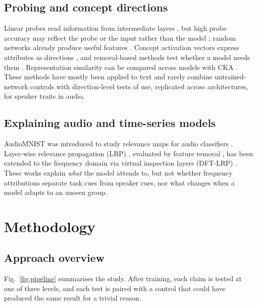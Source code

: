 \documentclass[conference]{IEEEtran}
\begin{document}
\subsection{Probing and concept directions}
Linear probes read information from intermediate layers
\cite{alain2016probes}, but high probe accuracy may reflect the probe or the
input rather than the model \cite{hewitt2019control,belinkov2022probing};
random networks already produce useful features \cite{saxe2011random}.
Concept activation vectors express attributes as directions \cite{kim2018tcav},
and removal-based methods test whether a model needs them
\cite{elazar2018adversarial,ravfogel2020inlp,elazar2021amnesic}.
Representation similarity can be compared across models with CKA
\cite{kornblith2019cka}. These methods have mostly been applied to text and
rarely combine untrained-network controls with direction-level tests of use,
replicated across architectures, for speaker traits in audio.

\subsection{Explaining audio and time-series models}
AudioMNIST was introduced to study relevance maps for audio classifiers
\cite{becker2024audiomnist}. Layer-wise relevance propagation (LRP)
\cite{bach2015lrp}, evaluated by feature removal \cite{samek2017evaluating},
has been extended to the frequency domain via virtual inspection layers
(DFT-LRP) \cite{vielhaben2024virtual}. These works explain \emph{what} the
model attends to, but not whether frequency attributions separate task cues
from speaker cues, nor what changes when a model adapts to an unseen group.

\section{Methodology}\label{sec:method}

\subsection{Approach overview}
Fig.~\ref{fig:pipeline} summarises the study. After training, each claim is
tested at one of three levels, and each test is paired with a control that
could have produced the same result for a trivial reason.
\end{document}
